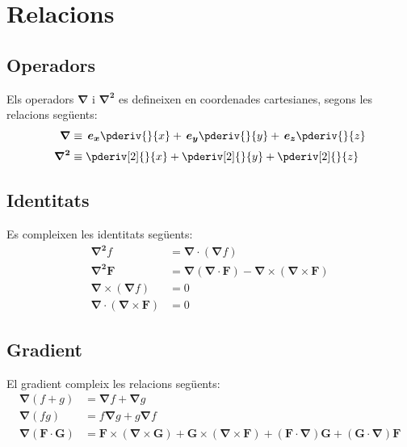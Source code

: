 \documentclass[catalan,a4paper,twoside,11pt]{article}
\begin{document}
\section{Relacions}

\subsection{Operadors}
\renewcommand{\va}{\ensuremath{\,\boldsymbol{e_x}}}
\renewcommand{\vb}{\ensuremath{\,\boldsymbol{e_y}}}
\renewcommand{\vc}{\ensuremath{\,\boldsymbol{e_z}}}
Els operadors $\boldsymbol{\nabla}$ i $\boldsymbol{\nabla^2}$ es defineixen en coordenades cartesianes, segons les relacions següents:
\begin{align}
    \boldsymbol{\nabla} &\equiv \va \pderiv{}{x} + \vb \pderiv{}{y}
    + \vc \pderiv{}{z}\\[0.5ex]
    \boldsymbol{\nabla^2} &\equiv \pderiv[2]{}{x} + \pderiv[2]{}{y}+ \pderiv[2]{}{z}
\end{align}

\subsection{Identitats}
Es compleixen les identitats següents:
\begin{align}
    \boldsymbol{\nabla^2}f &=\boldsymbol{\nabla\cdot}(\boldsymbol{\nabla}f)\\
    \boldsymbol{\nabla^2 F}  &= \boldsymbol{\nabla}(\boldsymbol{\nabla\cdot F})
    - \boldsymbol{\nabla\times}(\boldsymbol{\nabla\times F})\\
    \boldsymbol{\nabla\times}(\boldsymbol{\nabla}f) &= 0\\
    \boldsymbol{\nabla\cdot}(\boldsymbol{\nabla\times F}) &= 0
\end{align}

\subsection{Gradient}
El gradient compleix les relacions següents:
\begin{align}
    \boldsymbol{\nabla}(f+g) &= \boldsymbol{\nabla}f + \boldsymbol{\nabla}g\\
    \boldsymbol{\nabla}(fg) &= f \boldsymbol{\nabla}g + g \boldsymbol{\nabla} f\\
    \boldsymbol{\nabla}(\boldsymbol{F\cdot G}) &=
    \boldsymbol{F\times}(\boldsymbol{\nabla\times G}) + \boldsymbol{G\times}(\boldsymbol{\nabla\times F}) +
    (\boldsymbol{F\cdot\nabla})\boldsymbol{G} + (\boldsymbol{G\cdot\nabla})\boldsymbol{F}
\end{align}
\end{document}
